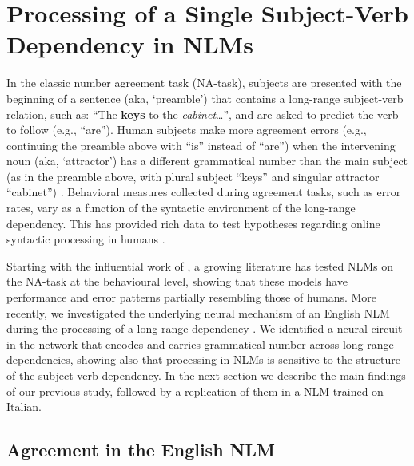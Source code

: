 \section{Processing of a Single Subject-Verb Dependency in NLMs}
In the classic number agreement task (NA-task), subjects are presented with the beginning of a sentence (aka, `preamble') that contains a long-range subject-verb relation, such as: ``The \textbf{keys} to the \emph{cabinet}\ldots'', and are asked to predict the verb to follow (e.g., ``are''). Human subjects make more agreement errors (e.g., continuing the preamble  above with ``is'' instead of ``are'') when the intervening noun (aka, `attractor') has a different grammatical number than the main subject (as in the preamble above, with plural subject ``keys'' and singular attractor ``cabinet'') . Behavioral measures collected during agreement tasks, such as error rates, vary as a function of the syntactic environment of the long-range dependency. This has provided rich data to test hypotheses regarding online syntactic processing in humans \citep[e.g., ][]{franck2002subject, franck2006agreement, franck2007syntactic}.

Starting with the influential work of \citet{Linzen:etal:2016}, a growing
literature \citep[e.g.,][]{Gulordava:etal:2018, Bernardy:Lappin:2017,
  Giulianelli:etal:2018, Kuncoro:etal:2018a,Linzen:Leonard:2018,jumelet2019analysing} has
tested NLMs on the NA-task at the behavioural level, showing that these models have performance
and error patterns partially resembling those of humans.
More recently, we investigated the underlying neural mechanism of an
English NLM during the processing of a long-range dependency
\citep{lakretz2019emergence}. We identified a neural circuit in the
network that encodes and carries grammatical number across long-range
dependencies, showing also that processing in NLMs is sensitive to the
structure of the subject-verb dependency. In the next section we
describe the main findings of our previous study, followed by a replication of them in a NLM trained on Italian. 



\subsection{Agreement in the English NLM}


